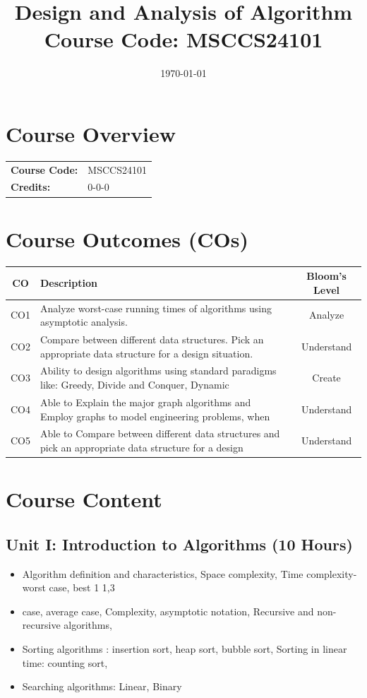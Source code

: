 \documentclass[12pt,a4paper]{article}%
\title{Design and Analysis of Algorithm\\[0.5em]\large Course Code: MSCCS24101}%
\author{}%
\date{\today}%
\begin{document}
%
\normalsize%
\maketitle%
\tableofcontents%
\newpage%
\section{Course Overview}%
\label{sec:CourseOverview}%
\begin{tabular}{ll}%
\textbf{Course Code:}&MSCCS24101\\%
\textbf{Credits:}&0{-}0{-}0\\%
\end{tabular}

%
\section{Course Outcomes (COs)}%
\label{sec:CourseOutcomes(COs)}%
\begin{tabular}{|c|p{10cm}|c|}%
\hline%
\textbf{CO}&\textbf{Description}&\textbf{Bloom's Level}\\%
\hline%
CO1&Analyze worst{-}case running times of algorithms using asymptotic analysis.&Analyze\\%
\hline%
CO2&Compare between different data structures. Pick an appropriate data structure for a design situation.&Understand\\%
\hline%
CO3&Ability to design algorithms using standard paradigms like: Greedy, Divide and Conquer, Dynamic&Create\\%
\hline%
CO4&Able to Explain the major graph algorithms and Employ graphs to model engineering problems, when&Understand\\%
\hline%
CO5&Able to Compare between different data structures and pick an appropriate data structure for a design&Understand\\%
\hline%
\end{tabular}

%
\section{Course Content}%
\label{sec:CourseContent}%
\subsection{Unit I: Introduction to Algorithms (10 Hours)}%
\label{subsec:UnitIIntroductiontoAlgorithms(10Hours)}%
\begin{itemize}%
\item Algorithm definition and characteristics, Space complexity, Time complexity- worst case, best 1 1,3%
\item case, average case, Complexity, asymptotic notation, Recursive and non-recursive algorithms,%
\item Sorting algorithms : insertion sort, heap sort, bubble sort, Sorting in linear time: counting sort,%
\item Searching algorithms: Linear, Binary%
\end{itemize}
\end{document}
